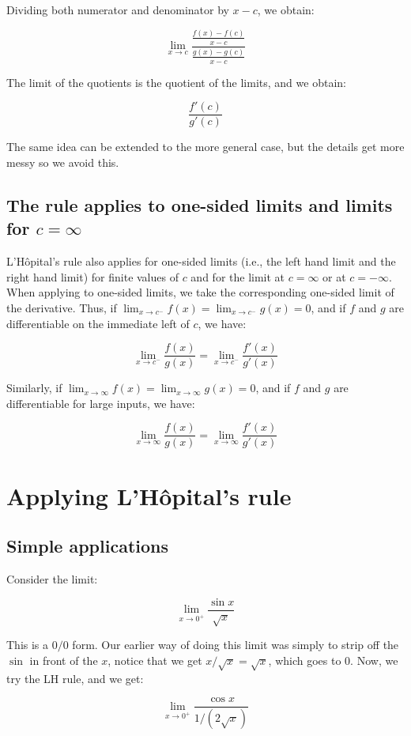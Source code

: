 \documentclass{amsart}
\begin{document}
Dividing both numerator and denominator by $x - c$, we obtain:

$$\lim_{x \to c} \frac{\frac{f(x) - f(c)}{x - c}}{\frac{g(x) - g(c)}{x - c}}$$

The limit of the quotients is the quotient of the limits, and we obtain:

$$\frac{f'(c)}{g'(c)}$$

The same idea can be extended to the more general case, but the
details get more messy so we avoid this.

\subsection{The rule applies to one-sided limits and limits for $c = \infty$}

L'H\^{o}pital's rule also applies for one-sided limits (i.e., the left
hand limit and the right hand limit) for finite values of $c$ and for
the limit at $c = \infty$ or at $c = -\infty$. When applying to
one-sided limits, we take the corresponding one-sided limit of the
derivative. Thus, if $\lim_{x \to c^-} f(x) = \lim_{x \to c^-} g(x) =
0$, and if $f$ and $g$ are differentiable on the immediate left of
$c$, we have:

$$\lim_{x \to c^-} \frac{f(x)}{g(x)} = \lim_{x \to c^-} \frac{f'(x)}{g'(x)}$$

Similarly, if $\lim_{x \to \infty} f(x) = \lim_{x \to \infty} g(x) =
0$, and if $f$ and $g$ are differentiable for large inputs, we have:

$$\lim_{x \to \infty} \frac{f(x)}{g(x)} = \lim_{x \to \infty} \frac{f'(x)}{g'(x)}$$
\section{Applying L'H\^{o}pital's rule}

\subsection{Simple applications}

Consider the limit:

$$\lim_{x \to 0^+} \frac{\sin x}{\sqrt{x}}$$

This is a $0/0$ form. Our earlier way of doing this limit was simply
to strip off the $\sin$ in front of the $x$, notice that we get
$x/\sqrt{x} = \sqrt{x}$, which goes to $0$. Now, we try the LH rule,
and we get:

$$\lim_{x \to 0^+} \frac{\cos x}{1/(2\sqrt{x})}$$
\end{document}
